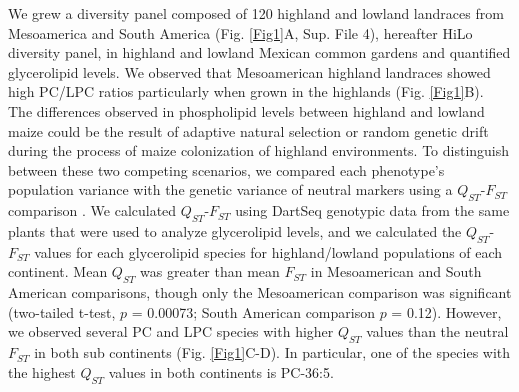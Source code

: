 \documentclass[9pt,twocolumn,twoside,lineno]{BioRxiv}
\begin{document}
We grew a diversity panel composed of 120 highland and lowland landraces from Mesoamerica and South America (Fig. \ref{Fig1}A, Sup. File 4), hereafter HiLo diversity panel, in highland and lowland Mexican common gardens and quantified glycerolipid levels.    
We observed that Mesoamerican highland landraces showed  high PC/LPC ratios  particularly when grown in the highlands (Fig. \ref{Fig1}B).
The differences observed in phospholipid levels between highland and lowland maize could be the result of adaptive natural selection or random genetic drift during the process of maize colonization of highland environments.
To distinguish between these two competing scenarios, we compared each phenotype’s population variance with the genetic variance of neutral markers using a $Q_{ST}$-$F_{ST}$ comparison \cite{Leinonen2013-ic}.
We calculated $Q_{ST}$-$F_{ST}$ using DartSeq genotypic data from the same plants that were used to analyze glycerolipid levels, and we calculated the $Q_{ST}$-$F_{ST}$ values for each glycerolipid species for highland/lowland populations of each continent. 
Mean $Q_{ST}$ was greater than mean $F_{ST}$ in Mesoamerican and South American comparisons, though only the Mesoamerican comparison was significant (two-tailed t-test, $p$ = 0.00073; South American comparison $p$ = 0.12).
However, we observed several PC and LPC species with higher $Q_{ST}$ values than the neutral $F_{ST}$ in both sub continents (Fig. \ref{Fig1}C-D).
In particular, one of the species with the highest $Q_{ST}$ values in both continents is PC-36:5. 
\end{document}
